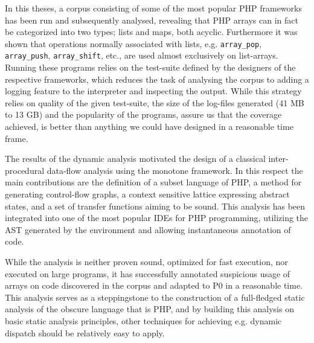 

In this theses, a corpus consisting of some of the most popular PHP frameworks has been run and subsequently analysed, revealing that PHP arrays can in fact be categorized into two types; lists and maps, both acyclic. Furthermore it was shown that operations normally associated with lists, e.g. \texttt{array\_pop}, \texttt{array\_push}, \texttt{array\_shift}, etc., are used almost exclusively on list-arrays. Running these programs relies on the test-suite defined by the designers of the respective frameworks, which reduces the task of analysing the corpus to adding a logging feature to the interpreter and inspecting the output. While this strategy relies on quality of the given test-suite, the size of the log-files generated (41 MB to 13 GB) and the popularity of the programs, assure us that the coverage achieved, is better than anything we could have designed in a reasonable time frame.


The results of the dynamic analysis motivated the design of a classical inter-procedural data-flow analysis using the monotone framework. In this respect the main contributions are the definition of a subset language of PHP, a method for generating control-flow graphs, a context sensitive lattice expressing abstract states, and a set of transfer functions aiming to be sound. This analysis has been integrated into one of the most popular IDEs for PHP programming, utilizing the AST generated by the environment and allowing instantaneous annotation of code. 

While the analysis is neither proven sound, optimized for fast execution, nor executed on large programs, it has successfully annotated suspicious usage of arrays on code discovered in the corpus and adapted to P0 in a reasonable time. This analysis serves as a steppingstone to the construction of a full-fledged static analysis of the obscure language that is PHP, and by building this analysis on basic static analysis principles, other techniques for achieving e.g. dynamic dispatch should be relatively easy to apply. 







